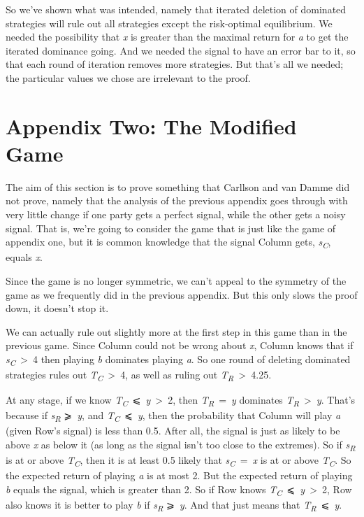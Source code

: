 \documentclass[
  10pt,
  letterpaper,
  DIV=11,
  numbers=noendperiod,
  twoside]{scrartcl}
\begin{document}
So we've shown what was intended, namely that iterated deletion of
dominated strategies will rule out all strategies except the
risk-optimal equilibrium. We needed the possibility that \emph{x} is
greater than the maximal return for \emph{a} to get the iterated
dominance going. And we needed the signal to have an error bar to it, so
that each round of iteration removes more strategies. But that's all we
needed; the particular values we chose are irrelevant to the proof.

\section*{Appendix Two: The Modified
Game}\label{appendixtwo:themodifiedgame}

The aim of this section is to prove something that Carllson and van
Damme did not prove, namely that the analysis of the previous appendix
goes through with very little change if one party gets a perfect signal,
while the other gets a noisy signal. That is, we're going to consider
the game that is just like the game of appendix one, but it is common
knowledge that the signal Column gets, \emph{s\textsubscript{C}}, equals
\emph{x}.

Since the game is no longer symmetric, we can't appeal to the symmetry
of the game as we frequently did in the previous appendix. But this only
slows the proof down, it doesn't stop it.

We can actually rule out slightly more at the first step in this game
than in the previous game. Since Column could not be wrong about
\emph{x}, Column knows that if \emph{s\textsubscript{C}}~\textgreater~4
then playing \emph{b} dominates playing \emph{a}. So one round of
deleting dominated strategies rules out
\emph{T\textsubscript{C}}~\textgreater~4, as well as ruling out
\emph{T\textsubscript{R}}~\textgreater~4.25.

At any stage, if we know
\emph{T\textsubscript{C}}~⩽~\emph{y}~\textgreater~2, then
\emph{T\textsubscript{R}}~=~\emph{y} dominates
\emph{T\textsubscript{R}}~\textgreater~\emph{y}. That's because if
\emph{s\textsubscript{R}} ⩾~\emph{y}, and
\emph{T\textsubscript{C}}~⩽~\emph{y}, then the probability that Column
will play \emph{a} (given Row's signal) is less than 0.5. After all, the
signal is just as likely to be above \emph{x} as below it (as long as
the signal isn't too close to the extremes). So if
\emph{s\textsubscript{R}} is at or above \emph{T\textsubscript{C}}, then
it is at least 0.5 likely that \emph{s\textsubscript{C}}~=~\emph{x} is
at or above \emph{T\textsubscript{C}}. So the expected return of playing
\emph{a} is at most 2. But the expected return of playing \emph{b}
equals the signal, which is greater than 2. So if Row knows
\emph{T\textsubscript{C}}~⩽~\emph{y}~\textgreater~2, Row also knows it
is better to play \emph{b} if \emph{s\textsubscript{R}} ⩾~\emph{y}. And
that just means that \emph{T\textsubscript{R}}~⩽~\emph{y}.
\end{document}
